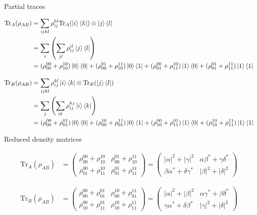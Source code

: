 \documentclass[aspectratio=1610]{beamer}					%
\begin{document}
\begin{frame}{Partial traces}

\begin{align*}
\mathrm{Tr}_{A}(\rho_{AB}) &= \sum_{ijkl} \rho_{ij}^{kl} \mathrm{Tr}_{A}(\ket{i}\bra{k}) \otimes \ket{j}\bra{l}\\
&= \sum_{i} \left(\sum_{jl} \rho_{ij}^{il} \ket{j}\bra{l}\right)\\
&= (\rho_{00}^{00}+\rho_{10}^{10})\ket{0}\bra{0} + (\rho_{00}^{01}+\rho_{10}^{11})\ket{0}\bra{1} + (\rho_{01}^{00}+\rho_{11}^{10})\ket{1}\bra{0} + (\rho_{01}^{01}+\rho_{11}^{11})\ket{1}\bra{1}
\end{align*}

\begin{align*}
\mathrm{Tr}_{B}(\rho_{AB}) &= \sum_{ijkl} \rho_{ij}^{kl} \ket{i}\bra{k} \otimes \mathrm{Tr}_{B}(\ket{j}\bra{l})\\
&= \sum_{j} \left(\sum_{ik} \rho_{ij}^{kj} \ket{i}\bra{k}\right)\\
&= (\rho_{00}^{00}+\rho_{01}^{01})\ket{0}\bra{0} + (\rho_{00}^{10}+\rho_{01}^{11})\ket{0}\bra{1} + (\rho_{10}^{00}+\rho_{11}^{01})\ket{1}\bra{0} + (\rho_{10}^{10}+\rho_{11}^{11})\ket{1}\bra{1}
\end{align*}

\end{frame}

\begin{frame}{Reduced density matrices}

\begin{align*}
\mathrm{Tr}_{A}(\rho_{AB}) &=
\begin{pmatrix}
\rho_{00}^{00}+\rho_{10}^{10} & \rho_{00}^{01}+\rho_{10}^{11}\\
\rho_{01}^{00}+\rho_{11}^{10} & \rho_{01}^{01}+\rho_{11}^{11}
\end{pmatrix}
= \begin{pmatrix}
|\alpha|^{2} + |\gamma|^{2} & \alpha\beta^{*} + \gamma\delta^{*}\\
\beta\alpha^{*} + \delta\gamma^{*} & |\beta|^{2} + |\delta|^{2}
\end{pmatrix}
\end{align*}

\begin{align*}
\mathrm{Tr}_{B}(\rho_{AB}) &=
\begin{pmatrix}
\rho_{00}^{00}+\rho_{01}^{01} & \rho_{00}^{10}+\rho_{01}^{11}\\
\rho_{10}^{00}+\rho_{11}^{01} & \rho_{10}^{10}+\rho_{11}^{11}
\end{pmatrix}
= \begin{pmatrix}
|\alpha|^{2} + |\beta|^{2} & \alpha\gamma^{*} + \beta\delta^{*}\\
\gamma\alpha^{*} + \delta\beta^{*} & |\gamma|^{2} + |\delta|^{2}
\end{pmatrix}
\end{align*}

\end{frame}
\end{document}
